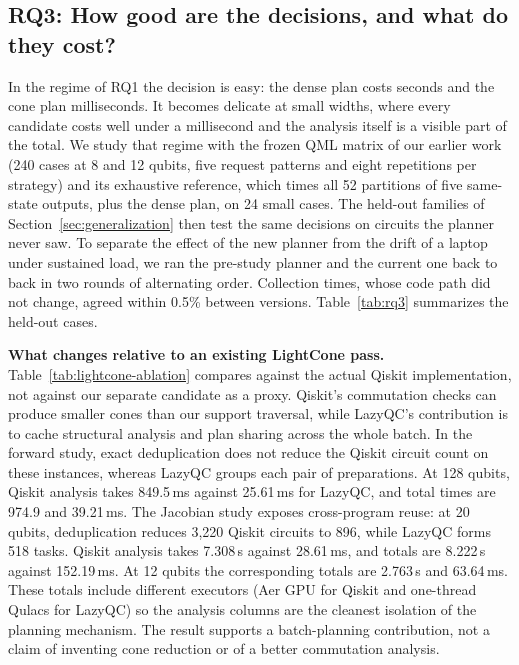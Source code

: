 \subsection{RQ3: How good are the decisions, and what do they cost?}
\label{sec:rq3}
In the regime of RQ1 the decision is easy: the dense plan costs seconds and the cone plan milliseconds. It becomes delicate at small widths, where every candidate costs well under a millisecond and the analysis itself is a visible part of the total. We study that regime with the frozen QML matrix of our earlier work (240 cases at 8 and 12 qubits, five request patterns and eight repetitions per strategy) and its exhaustive reference, which times all 52 partitions of five same-state outputs, plus the dense plan, on 24 small cases. The held-out families of Section~\ref{sec:generalization} then test the same decisions on circuits the planner never saw. To separate the effect of the new planner from the drift of a laptop under sustained load, we ran the pre-study planner and the current one back to back in two rounds of alternating order. Collection times, whose code path did not change, agreed within 0.5\% between versions. Table~\ref{tab:rq3} summarizes the held-out cases.

\begin{table}[!t]
\caption{Direct Comparison with Qiskit's Commutation-Aware \texttt{LightCone} Pass Followed by Aer GPU. S/D Is the Number of Circuits without/with Exact Reduced-Circuit Deduplication. All Analysis and Total Times Are Milliseconds and Include Lowering and Expectation Setup. LazyQC Uses \texttt{auto} Planning and Single-Thread Qulacs. Forward Rows Are Depth-Four Hardware-Efficient Circuits with $Z$ on Every Wire; Jacobian Rows Include the Base and All Shifted Programs. Values Are Geometric Means over Two Seeds.}
\label{tab:lightcone-ablation}
\centering
\setlength{\tabcolsep}{4pt}
\footnotesize
\resizebox{\textwidth}{!}{}
\end{table}

\textbf{What changes relative to an existing LightCone pass.} Table~\ref{tab:lightcone-ablation} compares against the actual Qiskit implementation, not against our separate candidate as a proxy. Qiskit's commutation checks can produce smaller cones than our support traversal, while LazyQC's contribution is to cache structural analysis and plan sharing across the whole batch. In the forward study, exact deduplication does not reduce the Qiskit circuit count on these instances, whereas LazyQC groups each pair of preparations. At 128 qubits, Qiskit analysis takes 849.5\,ms against 25.61\,ms for LazyQC, and total times are 974.9 and 39.21\,ms. The Jacobian study exposes cross-program reuse: at 20 qubits, deduplication reduces 3,220 Qiskit circuits to 896, while LazyQC forms 518 tasks. Qiskit analysis takes 7.308\,s against 28.61\,ms, and totals are 8.222\,s against 152.19\,ms. At 12 qubits the corresponding totals are 2.763\,s and 63.64\,ms. These totals include different executors (Aer GPU for Qiskit and one-thread Qulacs for LazyQC) so the analysis columns are the cleanest isolation of the planning mechanism. The result supports a batch-planning contribution, not a claim of inventing cone reduction or of a better commutation analysis.

